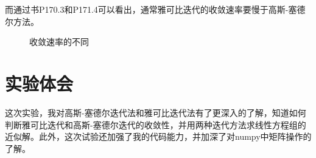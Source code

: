 \documentclass{article}
\begin{document}
	而通过书P170.3和P171.4可以看出，通常雅可比迭代的收敛速率要慢于高斯-塞德尔方法。
\begin{figure}
	\centering
	\caption{收敛速率的不同}
\end{figure}

\section{实验体会}
	这次实验，我对高斯-塞德尔迭代法和雅可比迭代法有了更深入的了解，知道如何判断雅可比迭代和高斯-塞德尔迭代的收敛性，并用两种迭代方法求线性方程组的近似解。此外，这次试验还加强了我的代码能力，并加深了对numpy中矩阵操作的了解。
\end{document}
